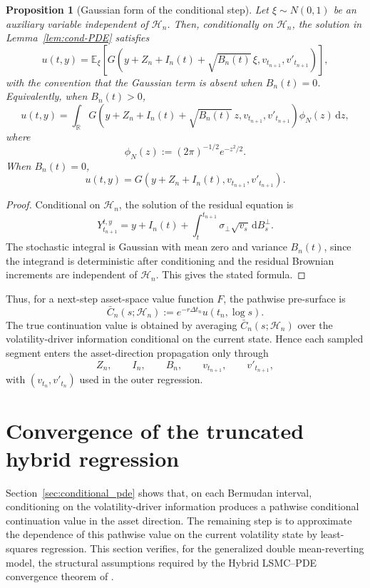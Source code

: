 \documentclass[pdflatex,sn-mathphys-num]{sn-jnl}
\theoremstyle{thmstyleone}%
\newtheorem{proposition}[theorem]{Proposition}
\theoremstyle{thmstylethree}%
\theoremstyle{thmstyletwo}%
\newcommand{\dd}{\mathrm d}
\newcommand{\E}{\mathbb E}
\newcommand{\R}{\mathbb R}
\begin{document}
\begin{proposition}[Gaussian form of the conditional step]\label{prop:conditional-gaussian-step}
Let $\xi\sim N(0,1)$ be an auxiliary variable independent of $\mathcal H_n$.
Then, conditionally on $\mathcal H_n$, the solution in
Lemma~\ref{lem:cond-PDE} satisfies
\[
u(t,y)
=
\E_\xi\!\left[
G\!\left(
y+Z_n+I_n(t)+\sqrt{B_n(t)}\,\xi,
v_{t_{n+1}},
v'_{t_{n+1}}
\right)
\right],
\]
with the convention that the Gaussian term is absent when $B_n(t)=0$.
Equivalently, when $B_n(t)>0$,
\[
u(t,y)
=
\int_{\R}
G\!\left(
y+Z_n+I_n(t)+\sqrt{B_n(t)}\,z,
v_{t_{n+1}},
v'_{t_{n+1}}
\right)
\phi_N(z)\,\dd z,
\]
where
\[
\phi_N(z):=(2\pi)^{-1/2}e^{-z^2/2}.
\]
When $B_n(t)=0$,
\[
u(t,y)
=
G\!\left(y+Z_n+I_n(t),v_{t_{n+1}},v'_{t_{n+1}}\right).
\]
\end{proposition}

\begin{proof}
Conditional on $\mathcal H_n$, the solution of the residual equation is
\[
Y_{t_{n+1}}^{t,y}
=
y+I_n(t)
+\int_t^{t_{n+1}}\sigma_\perp\sqrt{v_s}\,\dd B_s^\perp.
\]
The stochastic integral is Gaussian with mean zero and variance $B_n(t)$, since
the integrand is deterministic after conditioning and the residual Brownian
increments are independent of $\mathcal H_n$. This gives the stated formula.
\end{proof}

Thus, for a next-step asset-space value function $F$, the pathwise pre-surface
is
\[
\bar C_n(s;\mathcal H_n)
:=
e^{-r\Delta t_n}u(t_n,\log s).
\]
The true continuation value is obtained by averaging $\bar C_n(s;\mathcal H_n)$
over the volatility-driver information conditional on the current state. Hence
each sampled segment enters the asset-direction propagation only through
\[
Z_n,\qquad I_n,\qquad B_n,\qquad v_{t_{n+1}},\qquad v'_{t_{n+1}},
\]
with $(v_{t_n},v'_{t_n})$ used in the outer regression.


\section{Convergence of the truncated hybrid regression}
\label{sec:as_convergence}

Section~\ref{sec:conditional_pde} shows that, on each Bermudan interval,
conditioning on the volatility-driver information produces a pathwise
conditional continuation value in the asset direction. The remaining step is to
approximate the dependence of this pathwise value on the current volatility
state by least-squares regression. This section verifies, for the generalized
double mean-reverting model, the structural assumptions required by the Hybrid
LSMC--PDE convergence theorem of \cite{farahany2020mixing}.
\end{document}
